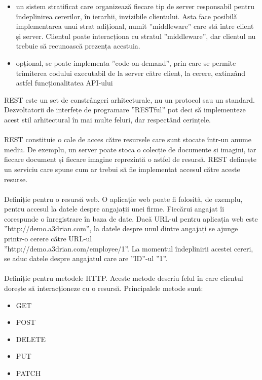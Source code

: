 \begin{itemize}
\begin{itemize}
	\end{itemize}
  \item un sistem stratificat care organizează fiecare tip de server responsabil pentru îndeplinirea cererilor, în ierarhii, invizibile clientului. Asta face posibilă implementarea unui strat adițional, numit ”middleware” care stă între client și server. Clientul poate interacționa cu stratul ”middleware”, dar clientul nu trebuie să recunoască prezența acestuia.
  \item opțional, se poate implementa ”code-on-demand”, prin care se permite trimiterea codului executabil de la server către client, la cerere, extinzând astfel funcționalitatea API-ului
\end{itemize}

REST este un set de constrângeri arhitecturale, nu un protocol sau un standard. Dezvoltatorii de interfețe de programare ”RESTful” pot deci să implementeze acest stil arhitectural în mai multe feluri, dar respectând cerințele.
\\ \\
REST constituie o cale de acces către resursele care sunt stocate într-un anume mediu. De exemplu, un server poate stoca o colecție de documente și imagini, iar fiecare document și fiecare imagine reprezintă o astfel de resursă. REST definește un serviciu care spune cum ar trebui să fie implementat accesul către aceste resurse.
\\ \\
Definiție pentru o resursă web. O aplicație web poate fi folosită, de exemplu, pentru accesul la datele despre angajații unei firme. Fiecărui angajat îi corespunde o înregistrare în baza de date. Dacă URL-ul pentru aplicația web este ”http://demo.a3drian.com”, la datele despre unul dintre angajați se ajunge printr-o cerere către URL-ul\\”http://demo.a3drian.com/employee/1”. La momentul îndeplinirii acestei cereri, se aduc datele despre angajatul care are ”ID”-ul ”1”.
\\ \\
Definiție pentru metodele HTTP. Aceste metode descriu felul în care clientul dorește să interacționeze cu o resursă. Principalele metode sunt:
\begin{itemize}
  \item GET
  \item POST
  \item DELETE
  \item PUT
  \item PATCH
\end{itemize}

